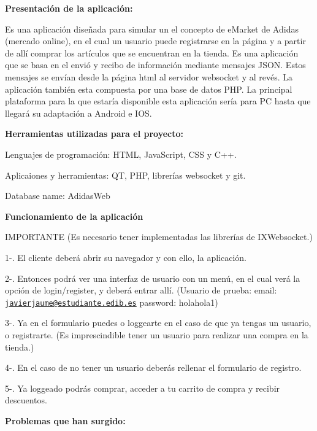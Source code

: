 



{\bfseries Presentación de la aplicación\+:}

Es una aplicación diseñada para simular un el concepto de e\+Market de Adidas (mercado online), en el cual un usuario puede registrarse en la página y a partir de allí comprar los artículos que se encuentran en la tienda. Es una aplicación que se basa en el envió y recibo de información mediante mensajes J\+S\+ON. Estos mensajes se envían desde la página html al servidor websocket y al revés. La aplicación también esta compuesta por una base de datos P\+HP. La principal plataforma para la que estaría disponible esta aplicación sería para PC hasta que llegará su adaptación a Android e I\+OS.

{\bfseries Herramientas utilizadas para el proyecto\+:}


\begin{DoxyItemize}
\item Lenguajes de programación\+: H\+T\+ML, Java\+Script, C\+SS y C++.
\item Aplicaiones y herramientas\+: QT, P\+HP, librerías websocket y git.
\item Database name\+: Adidas\+Web
\end{DoxyItemize}

{\bfseries Funcionamiento de la aplicación}

I\+M\+P\+O\+R\+T\+A\+N\+TE (Es necesario tener implementadas las librerías de I\+X\+Websocket.)

1-\/. El cliente deberá abrir su navegador y con ello, la aplicación.

2-\/. Entonces podrá ver una interfaz de usuario con un menú, en el cual verá la opción de login/register, y deberá entrar allí. (Usuario de prueba\+: email\+: \href{mailto:javierjaume@estudiante.edib.es}{\tt javierjaume@estudiante.\+edib.\+es} password\+: holahola1)

3-\/. Ya en el formulario puedes o loggearte en el caso de que ya tengas un usuario, o registrarte. (Es imprescindible tener un usuario para realizar una compra en la tienda.)

4-\/. En el caso de no tener un usuario deberás rellenar el formulario de registro.

5-\/. Ya loggeado podrás comprar, acceder a tu carrito de compra y recibir descuentos.





{\bfseries Problemas que han surgido\+:}


